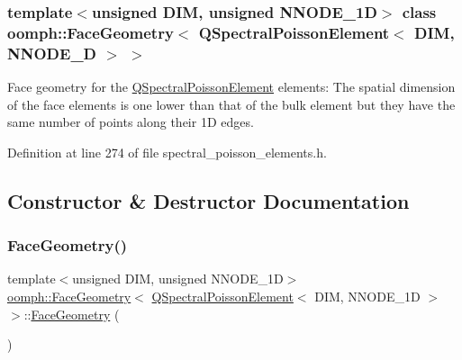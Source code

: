 \subsubsection*{template$<$unsigned D\+IM, unsigned N\+N\+O\+D\+E\+\_\+1D$>$\newline
class oomph\+::\+Face\+Geometry$<$ Q\+Spectral\+Poisson\+Element$<$ D\+I\+M, N\+N\+O\+D\+E\+\_\+D $>$ $>$}

Face geometry for the \hyperlink{classoomph_1_1QSpectralPoissonElement}{Q\+Spectral\+Poisson\+Element} elements\+: The spatial dimension of the face elements is one lower than that of the bulk element but they have the same number of points along their 1D edges. 

Definition at line 274 of file spectral\+\_\+poisson\+\_\+elements.\+h.



\subsection{Constructor \& Destructor Documentation}
\mbox{\label{classoomph_1_1FaceGeometry_3_01QSpectralPoissonElement_3_01DIM_00_01NNODE__1D_01_4_01_4_aa4c8a14fe50aa0a5454769b75490d253}} 
\subsubsection{\texorpdfstring{Face\+Geometry()}{FaceGeometry()}}
{\footnotesize\ttfamily template$<$unsigned D\+IM, unsigned N\+N\+O\+D\+E\+\_\+1D$>$ \\
\hyperlink{classoomph_1_1FaceGeometry}{oomph\+::\+Face\+Geometry}$<$ \hyperlink{classoomph_1_1QSpectralPoissonElement}{Q\+Spectral\+Poisson\+Element}$<$ D\+IM, N\+N\+O\+D\+E\+\_\+1D $>$ $>$\+::\hyperlink{classoomph_1_1FaceGeometry}{Face\+Geometry} (\begin{DoxyParamCaption}{ }\end{DoxyParamCaption})\hspace{0.3cm}{\ttfamily [inline]}}



